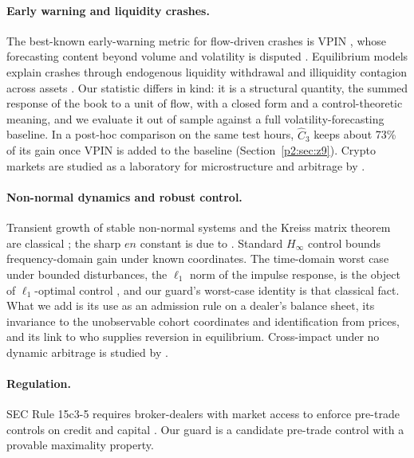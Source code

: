 \paragraph{Early warning and liquidity crashes.} The best-known early-warning metric for flow-driven crashes is VPIN \citep{p2:easley2012}, whose forecasting content beyond volume and volatility is disputed \citep{p2:andersen2014}. Equilibrium models explain crashes through endogenous liquidity withdrawal \citep{p2:huang2009} and illiquidity contagion across assets \citep{p2:cespa2014}. Our statistic differs in kind: it is a structural quantity, the summed response of the book to a unit of flow, with a closed form and a control-theoretic meaning, and we evaluate it out of sample against a full volatility-forecasting baseline. In a post-hoc comparison on the same test hours, $\hat C_3$ keeps about 73\% of its gain once VPIN is added to the baseline (Section~\ref{p2:sec:z9}). Crypto markets are studied as a laboratory for microstructure and arbitrage by \citet{p2:makarov2020}.

\paragraph{Non-normal dynamics and robust control.} Transient growth of stable non-normal systems and the Kreiss matrix theorem are classical \citep{p2:trefethen2005,p2:kreiss1962}; the sharp $en$ constant is due to \citet{p2:spijker1991}. Standard $H_\infty$ control bounds frequency-domain gain under known coordinates. The time-domain worst case under bounded disturbances, the $\ell_1$ norm of the impulse response, is the object of $\ell_1$-optimal control \citep{p2:vidyasagar1986,p2:dahleh1987,p2:dahleh1995}, and our guard's worst-case identity is that classical fact. What we add is its use as an admission rule on a dealer's balance sheet, its invariance to the unobservable cohort coordinates and identification from prices, and its link to who supplies reversion in equilibrium. Cross-impact under no dynamic arbitrage is studied by \citet{p2:schneider2019}.

\paragraph{Regulation.} SEC Rule 15c3-5 requires broker-dealers with market access to enforce pre-trade controls on credit and capital \citep{p2:sec2010}. Our guard is a candidate pre-trade control with a provable maximality property.

